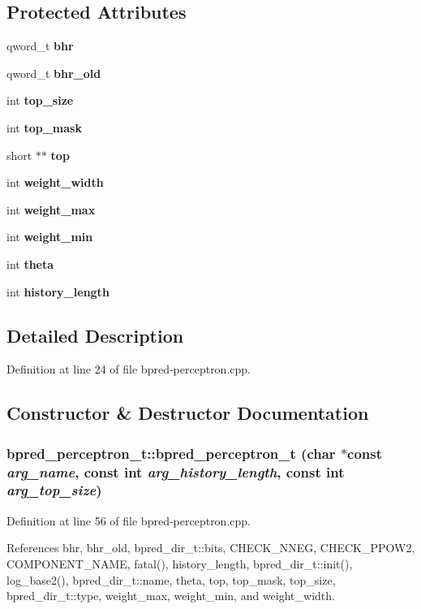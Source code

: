 \subsection*{Protected Attributes}
\begin{CompactItemize}
\item 
qword\_\-t {\bf bhr}
\item 
qword\_\-t {\bf bhr\_\-old}
\item 
int {\bf top\_\-size}
\item 
int {\bf top\_\-mask}
\item 
short $\ast$$\ast$ {\bf top}
\item 
int {\bf weight\_\-width}
\item 
int {\bf weight\_\-max}
\item 
int {\bf weight\_\-min}
\item 
int {\bf theta}
\item 
int {\bf history\_\-length}
\end{CompactItemize}


\subsection{Detailed Description}


Definition at line 24 of file bpred-perceptron.cpp.

\subsection{Constructor \& Destructor Documentation}
\subsubsection[{bpred\_\-perceptron\_\-t}]{\setlength{\rightskip}{0pt plus 5cm}bpred\_\-perceptron\_\-t::bpred\_\-perceptron\_\-t (char $\ast$const  {\em arg\_\-name}, \/  const int {\em arg\_\-history\_\-length}, \/  const int {\em arg\_\-top\_\-size})\hspace{0.3cm}{\tt  [inline]}}\label{classbpred__perceptron__t_01f88daa5f0caca12b61aeb021a1c0fd}




Definition at line 56 of file bpred-perceptron.cpp.

References bhr, bhr\_\-old, bpred\_\-dir\_\-t::bits, CHECK\_\-NNEG, CHECK\_\-PPOW2, COMPONENT\_\-NAME, fatal(), history\_\-length, bpred\_\-dir\_\-t::init(), log\_\-base2(), bpred\_\-dir\_\-t::name, theta, top, top\_\-mask, top\_\-size, bpred\_\-dir\_\-t::type, weight\_\-max, weight\_\-min, and weight\_\-width.

